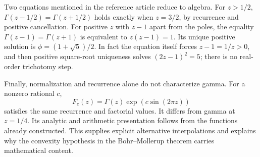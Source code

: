 Two equations mentioned in the reference article reduce to algebra.
For $z>1/2$,
$\Gamma(z-1/2)=\Gamma(z+1/2)$ holds exactly when $z=3/2$,
by recurrence and positive cancellation. For positive $z$ with
$z-1$ apart from the poles, the equality
$\Gamma(z-1)=\Gamma(z+1)$ is equivalent to $z(z-1)=1$.
Its unique positive solution is
$\phi=(1+\sqrt5)/2$. In fact the equation itself forces
$z-1=1/z>0$, and then positive square-root uniqueness solves
$(2z-1)^2=5$; there is no real-order trichotomy step.

Finally, normalization and recurrence alone do not characterize gamma.
For a nonzero rational $c$,
\[
 F_c(z)=\Gamma(z)\exp(c\sin(2\pi z))
\]
satisfies the same recurrence and factorial values. It differs from
gamma at $z=1/4$. Its analytic and arithmetic presentation follows from
the functions already constructed. This supplies explicit alternative
interpolations and explains why the convexity hypothesis in the
Bohr--Mollerup theorem carries mathematical content.
